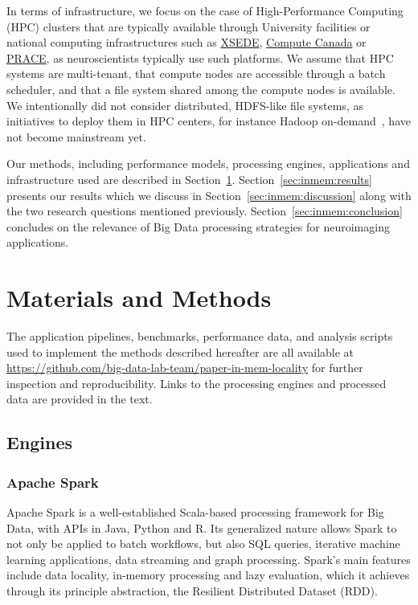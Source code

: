 In terms of infrastructure, we focus on the case of High-Performance Computing
(HPC) clusters that are typically available through University facilities or
national computing infrastructures such as \href{xsede.org}{XSEDE},
\href{http://computecanada.ca}{Compute Canada} or
\href{http://www.prace-ri.eu}{PRACE}, as neuroscientists typically use such
platforms. We assume that HPC systems are multi-tenant, that compute nodes are
accessible through a batch scheduler, and that a file system shared among the
compute nodes is available. We intentionally did not consider distributed,
HDFS-like file systems, as initiatives to deploy them in HPC centers, for
instance Hadoop on-demand~\cite{krishnan2011myhadoop}, have not become
mainstream yet.

Our methods, including performance models, processing engines, applications and
infrastructure used are described in Section~\ref{sec:inmem:methods}.
Section~\ref{sec:inmem:results} presents our results which we discuss in
Section~\ref{sec:inmem:discussion} along with the two research questions mentioned
previously. Section~\ref{sec:inmem:conclusion} concludes on the relevance of Big Data
processing strategies for neuroimaging applications.

\section{Materials and Methods} %
\label{sec:inmem:methods}

The application pipelines, benchmarks, performance data, and analysis scripts
used to implement the methods described hereafter are all available at
\url{https://github.com/big-data-lab-team/paper-in-mem-locality} for further
inspection and reproducibility. Links to the processing engines and processed
data are provided in the text.

\subsection{Engines} %

\subsubsection{Apache Spark}

Apache Spark is a well-established Scala-based processing framework for Big
Data, with APIs in Java, Python and R. Its generalized nature allows Spark to
not only be applied to batch workflows, but also SQL queries, iterative machine
learning applications, data streaming and graph processing. Spark's main
features include data locality, in-memory processing and lazy evaluation, which
it achieves through its principle abstraction, the Resilient Distributed Dataset
(RDD). 

